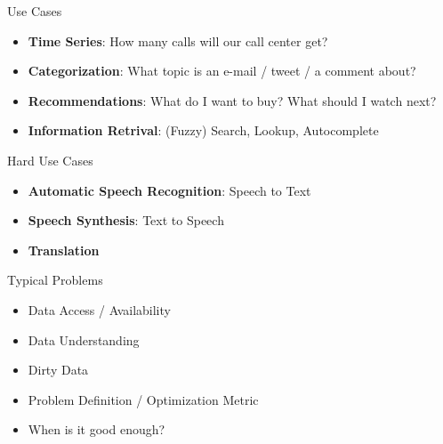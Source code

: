 \documentclass{beamer}
\begin{document}
\begin{frame}{Use Cases}
    \begin{itemize}
        \item \textbf{Time Series}: How many calls will our call center get?
        \item \textbf{Categorization}: What topic is an e-mail / tweet / a comment about?
        \item \textbf{Recommendations}: What do I want to buy? What should I watch next?
        \item \textbf{Information Retrival}: (Fuzzy) Search, Lookup, Autocomplete
    \end{itemize}
\end{frame}

\begin{frame}{Hard Use Cases}
    \begin{itemize}
        \item \textbf{Automatic Speech Recognition}: Speech to Text
        \item \textbf{Speech Synthesis}: Text to Speech
        \item \textbf{Translation}
    \end{itemize}
\end{frame}

\begin{frame}{Typical Problems}
    \begin{itemize}
        \item Data Access / Availability
        \item Data Understanding
        \item Dirty Data
        \item Problem Definition / Optimization Metric
        \item When is it good enough?
    \end{itemize}
\end{frame}

\end{document}
